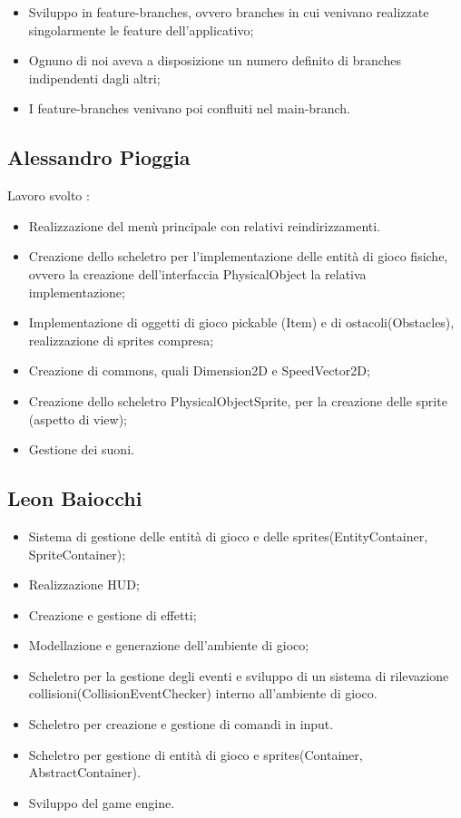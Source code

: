 \begin{itemize}
	\item Sviluppo in feature-branches, ovvero branches in cui venivano realizzate singolarmente le feature dell'applicativo;
	\item Ognuno di noi aveva a disposizione un numero definito di branches indipendenti dagli altri;
	\item I feature-branches venivano poi confluiti nel main-branch.
\end{itemize}

\subsection*{Alessandro Pioggia}
Lavoro svolto : 
\begin{itemize}
	\item Realizzazione del menù principale con relativi reindirizzamenti.
	\item Creazione dello scheletro per l'implementazione delle entità di gioco fisiche, ovvero la creazione dell'interfaccia PhysicalObject la relativa implementazione;
	\item Implementazione di oggetti di gioco pickable (Item) e di ostacoli(Obstacles), realizzazione di sprites compresa;
	\item Creazione di commons, quali Dimension2D e SpeedVector2D;
	\item Creazione dello scheletro PhysicalObjectSprite, per la creazione delle sprite (aspetto di view);
	\item Gestione dei suoni.
\end{itemize}


\subsection*{Leon Baiocchi}

\begin{itemize}
	\item Sistema di gestione delle entità di gioco e delle sprites(EntityContainer, SpriteContainer);
	\item Realizzazione HUD;
	\item Creazione e gestione di effetti;
	\item Modellazione e generazione dell'ambiente di gioco;
	\item Scheletro per la gestione degli eventi e sviluppo di un sistema di rilevazione collisioni(CollisionEventChecker) interno all'ambiente di gioco.
	\item Scheletro per creazione e gestione di comandi in input.
	\item Scheletro per gestione di entità di gioco e sprites(Container, AbstractContainer).
	\item Sviluppo del game engine.
\end{itemize}

